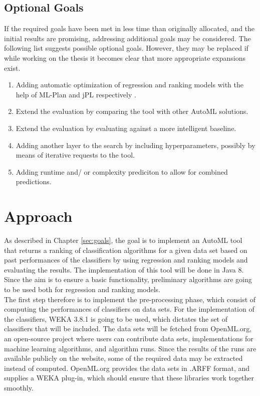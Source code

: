 \documentclass[12pt]{scrartcl}
\begin{document}
\subsection{Optional Goals}\label{subsec:optional_goals}
If the required goals have been met in less time than originally allocated, and the initial results are promising, addressing additional goals may be considered. The following list suggests possible optional goals. However, they may be replaced if while working on the thesis it becomes clear that more appropriate expansions exist.

\begin{enumerate}
	\item Adding automatic optimization of regression and ranking models with the help of ML-Plan and jPL\footnotemark{ } respectively \cite{intelligent2017jpl}.
	\item Extend the evaluation by comparing the tool with other AutoML solutions.
	\item Extend the evaluation by evaluating against a more intelligent baseline.
	\item Adding another layer to the search by including hyperparameters, possibly by means of iterative requests to the tool.
	\item Adding runtime and/ or complexity prediciton to allow for combined predictions.
\end{enumerate}

\section{Approach}\label{sec:approach}
As described in Chapter \ref{sec:goals}, the goal is to implement an AutoML tool that returns a ranking of classification algorithms for a given data set based on past performances of the classifiers by using regression and ranking models and evaluating the results. The implementation of this tool will be done in Java 8. Since the aim is to ensure a basic functionality, preliminary algorithms are going to be used both for regression and ranking models.\\ 

The first step therefore is to implement the pre-processing phase, which consist of computing the performances of classifiers on data sets. For the implementation of the classifiers, WEKA 3.8.1 is going to be used, which dictates the set of classifiers that will be included\footnotemark. The data sets will be fetched from OpenML.org, an open-source project where users can contribute data sets, implementations for machine learning algorithms, and algorithm runs. Since the results of the runs are available publicly on the website, some of the required data may be extracted instead of computed. OpenML.org provides the data sets in .ARFF format, and supplies a WEKA plug-in, which should ensure that these libraries work together smoothly. \\
\end{document}
